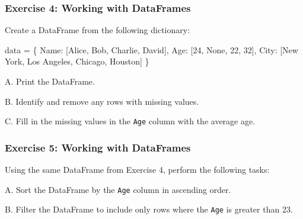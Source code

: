 \documentclass[
  letterpaper,
  DIV=11,
  numbers=noendperiod]{scrreprt}
\newenvironment{Shaded}{\begin{snugshade}}{\end{snugshade}}
\newcommand{\DecValTok}[1]{\textcolor[rgb]{0.68,0.00,0.00}{#1}}
\newcommand{\NormalTok}[1]{\textcolor[rgb]{0.00,0.23,0.31}{#1}}
\newcommand{\OperatorTok}[1]{\textcolor[rgb]{0.37,0.37,0.37}{#1}}
\newcommand{\StringTok}[1]{\textcolor[rgb]{0.13,0.47,0.30}{#1}}
\newcommand{\VariableTok}[1]{\textcolor[rgb]{0.07,0.07,0.07}{#1}}
\begin{document}
\hypertarget{exercise-4-working-with-dataframes}{%
\subsubsection{Exercise 4: Working with
DataFrames}\label{exercise-4-working-with-dataframes}}

Create a DataFrame from the following dictionary:

\begin{Shaded}
\begin{Highlighting}[]
\NormalTok{data }\OperatorTok{=}\NormalTok{ \{}
   \StringTok{\textquotesingle{}Name\textquotesingle{}}\NormalTok{: [}\StringTok{\textquotesingle{}Alice\textquotesingle{}}\NormalTok{, }\StringTok{\textquotesingle{}Bob\textquotesingle{}}\NormalTok{, }\StringTok{\textquotesingle{}Charlie\textquotesingle{}}\NormalTok{, }\StringTok{\textquotesingle{}David\textquotesingle{}}\NormalTok{],}
   \StringTok{\textquotesingle{}Age\textquotesingle{}}\NormalTok{: [}\DecValTok{24}\NormalTok{, }\VariableTok{None}\NormalTok{, }\DecValTok{22}\NormalTok{, }\DecValTok{32}\NormalTok{],}
   \StringTok{\textquotesingle{}City\textquotesingle{}}\NormalTok{: [}\StringTok{\textquotesingle{}New York\textquotesingle{}}\NormalTok{, }\StringTok{\textquotesingle{}Los Angeles\textquotesingle{}}\NormalTok{, }\StringTok{\textquotesingle{}Chicago\textquotesingle{}}\NormalTok{, }\StringTok{\textquotesingle{}Houston\textquotesingle{}}\NormalTok{]}
\NormalTok{\}}
\end{Highlighting}
\end{Shaded}

A. Print the DataFrame.

B. Identify and remove any rows with missing values.

C. Fill in the missing values in the \texttt{Age} column with the
average age.

\hypertarget{exercise-5-working-with-dataframes}{%
\subsubsection{Exercise 5: Working with
DataFrames}\label{exercise-5-working-with-dataframes}}

Using the same DataFrame from Exercise 4, perform the following tasks:

A. Sort the DataFrame by the \texttt{Age} column in ascending order.

B. Filter the DataFrame to include only rows where the \texttt{Age} is
greater than 23.
\end{document}

